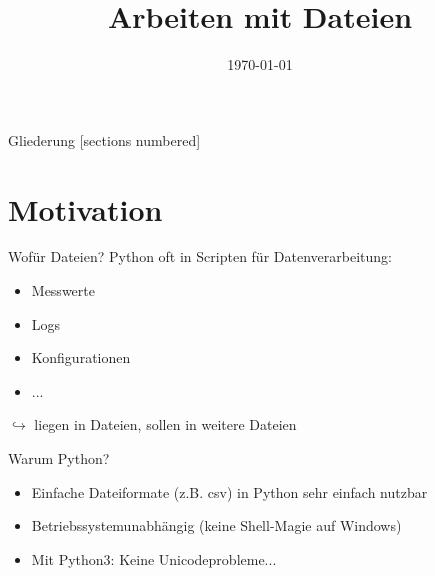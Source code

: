 



\title{Arbeiten mit Dateien}
\date{\today}

\usepackage{tikz} \usetikzlibrary{arrows, positioning}







\maketitle

\begin{frame}{Gliederung}
    [sections numbered]
    \tableofcontents
\end{frame}

\section{Motivation}

\begin{frame}{Wofür Dateien?}
	Python oft in Scripten für Datenverarbeitung:
    \begin{itemize}
        \item Messwerte
        \item Logs
        \item Konfigurationen
        \item ...
    \end{itemize}
    $\hookrightarrow$ liegen in Dateien, sollen in weitere Dateien
\end{frame}

\begin{frame}{Warum Python?}
	\begin{itemize}
        \item Einfache Dateiformate (z.B. csv) in Python sehr einfach nutzbar
        \item Betriebssystemunabhängig (keine Shell-Magie auf Windows)
        \item Mit Python3: Keine Unicodeprobleme...
	\end{itemize}
\end{frame}

